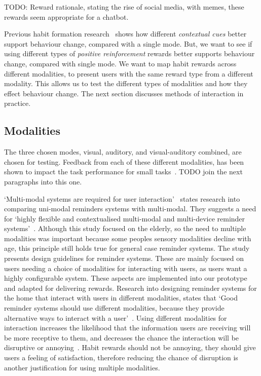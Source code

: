 \documentclass{scaffold/sigchi}
\begin{document}
TODO: Reward rationale, stating the rise of social media, with memes, these rewards seem appropriate for a chatbot.

Previous habit formation research~\cite{article_understanding_use_contextual_cues_design_impl} shows how different \textit{contextual cues} better support behaviour change, compared with a single mode. But, we want to see if using different types of \textit{positive reinforcement} rewards better supports behaviour change, compared with single mode. We want to map habit rewards across different modalities, to present users with the same reward type from a different modality.
This allows us to test the different types of modalities and how they effect behaviour change.
The next section discusses methods of interaction in practice.

\subsection{Modalities}
The three chosen modes, visual, auditory, and visual-auditory combined, are chosen for testing. Feedback from each of these different modalities, has been shown to impact the task performance for small tasks~\cite{chi_oussama_tap_the_shapetones}. TODO join the next paragraphs into this one.


`Multi-modal systems are required for user interaction'~\cite{article_user_centred_multimodal_reminders} states research into comparing uni-modal reminders systems with multi-modal.
They suggests a need for `highly flexible and contextualised multi-modal and multi-device reminder systems'~\cite{article_user_centred_multimodal_reminders}.
Although this study focused on the elderly, so the need to multiple modalities was important because some peoples sensory modalities decline with age,
this principle still holds true for general case reminder systems. The study presents design guidelines for reminder systems.
These are mainly focused on users needing a choice of modalities for interacting with users, as users want a highly configurable system.
These aspects are implemented into our prototype and adapted for delivering rewards.\newline
\newline
Research into designing reminder systems for the home that interact with users in different modalities, states that
`Good reminder systems should use different modalities, because they provide alternative ways to interact with a user'~\cite{article_designing_multimodal_reminders_for_home}.
Using different modalities for interaction increases the likelihood that the information users are receiving will be more receptive to them,
and decreases the chance the interaction will be disruptive or annoying~\cite{article_designing_multimodal_reminders_for_home}.
Habit rewards should not be annoying, they should give users a feeling of satisfaction, therefore reducing the chance of disruption is another justification for using multiple modalities.
\end{document}
